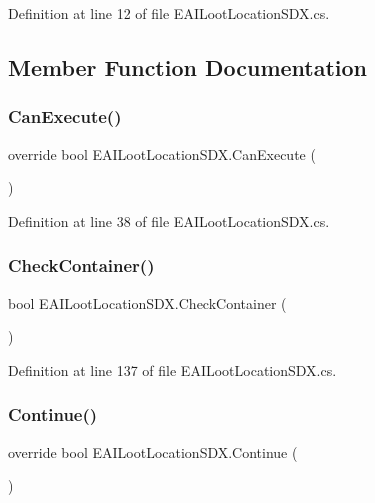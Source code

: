 Definition at line 12 of file E\+A\+I\+Loot\+Location\+S\+D\+X.\+cs.



\subsection{Member Function Documentation}
\mbox{\label{class_e_a_i_loot_location_s_d_x_ae2c253e985cb45c5a41a43855aeef878}} 
\subsubsection{\texorpdfstring{CanExecute()}{CanExecute()}}
{\footnotesize\ttfamily override bool E\+A\+I\+Loot\+Location\+S\+D\+X.\+Can\+Execute (\begin{DoxyParamCaption}{ }\end{DoxyParamCaption})}



Definition at line 38 of file E\+A\+I\+Loot\+Location\+S\+D\+X.\+cs.

\mbox{\label{class_e_a_i_loot_location_s_d_x_a5018aba6f0aeae83dd36ec9f60dd6ce1}} 
\subsubsection{\texorpdfstring{CheckContainer()}{CheckContainer()}}
{\footnotesize\ttfamily bool E\+A\+I\+Loot\+Location\+S\+D\+X.\+Check\+Container (\begin{DoxyParamCaption}{ }\end{DoxyParamCaption})}



Definition at line 137 of file E\+A\+I\+Loot\+Location\+S\+D\+X.\+cs.

\mbox{\label{class_e_a_i_loot_location_s_d_x_aaa159c3b6aef2e88fdc2cf7a1cbf383a}} 
\subsubsection{\texorpdfstring{Continue()}{Continue()}}
{\footnotesize\ttfamily override bool E\+A\+I\+Loot\+Location\+S\+D\+X.\+Continue (\begin{DoxyParamCaption}{ }\end{DoxyParamCaption})}



